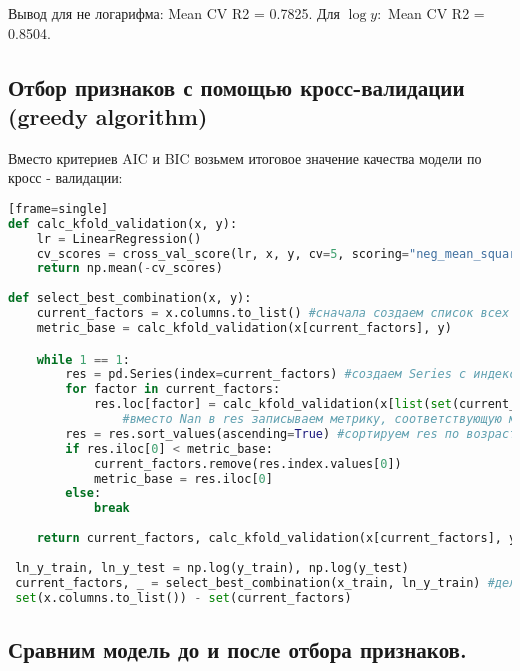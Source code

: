 	Вывод для не логарифма: Mean CV R2 = 0.7825. Для $ \log y:$  Mean CV R2 = 0.8504.

\subsection{Отбор признаков с помощью кросс-валидации (greedy algorithm)}\label{cha:linreg2/subsec:greedy}


	Вместо критериев AIC и BIC возьмем итоговое значение качества модели по кросс - валидации:

\begin{lstlisting}[language=Python][frame=single]
def calc_kfold_validation(x, y):
    lr = LinearRegression()
    cv_scores = cross_val_score(lr, x, y, cv=5, scoring="neg_mean_squared_error")
    return np.mean(-cv_scores)
    
def select_best_combination(x, y):
    current_factors = x.columns.to_list() #сначала создаем список всех наименований столбцов
    metric_base = calc_kfold_validation(x[current_factors], y)

    while 1 == 1:
        res = pd.Series(index=current_factors) #создаем Series c индексом current_factors и значениями = Nan
        for factor in current_factors:
            res.loc[factor] = calc_kfold_validation(x[list(set(current_factors)-{factor})], y)
                #вместо Nan в res записываем метрику, соответствующую модели без данного столбца
        res = res.sort_values(ascending=True) #сортируем res по возрастанию 
        if res.iloc[0] < metric_base:
            current_factors.remove(res.index.values[0])
            metric_base = res.iloc[0]
        else:
            break
            
    return current_factors, calc_kfold_validation(x[current_factors], y)
    
 ln_y_train, ln_y_test = np.log(y_train), np.log(y_test)
 current_factors, _ = select_best_combination(x_train, ln_y_train) #делаем отбор признаков на train (по ln_y_train)
 set(x.columns.to_list()) - set(current_factors)
\end{lstlisting}

\subsection*{Сравним модель до и после отбора признаков.}\label{cha:linreg2}

